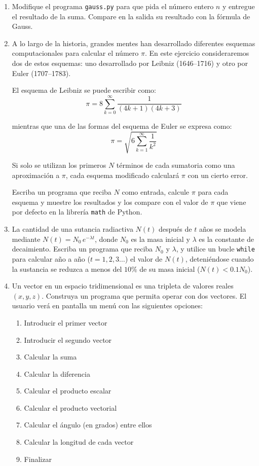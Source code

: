 \documentclass[12pt]{article}
\begin{document}
\begin{problemas}[]
\begin{enumerate}[leftmargin=*]

\item Modifique el programa \lstinline|gauss.py| para que pida el número entero $n$ y 
entregue el resultado de la suma. Compare en la salida su resultado con la fórmula de Gauss.

\item A lo largo de la historia, grandes mentes han desarrollado diferentes esquemas computacionales para calcular el número $\pi$. En este ejercicio consideraremos dos de estos esquemas: uno desarrollado por Leibniz (1646–1716) y otro por Euler (1707–1783).

El esquema de Leibniz se puede escribir como:
\[
\pi = 8 \sum_{k=0}^{\infty} \frac{1}{(4k + 1)(4k + 3)}
\]

mientras que una de las formas del esquema de Euler se expresa como:
\[
\pi = \sqrt{6 \sum_{k=1}^{\infty} \frac{1}{k^2}}
\]

Si solo se utilizan los primeros $N$ términos de cada sumatoria como una aproximación a 
$\pi$, cada esquema modificado calculará $\pi$ con un cierto error.

Escriba un programa que reciba $N$ como entrada, calcule $\pi$ para cada esquema y 
muestre los resultados y los compare con el valor de $\pi$ que viene por defecto en la
librería \lstinline|math| de Python.

\item  La cantidad de una sutancia radiactiva $N(t)$ después de $t$ años se modela mediante 
$N(t) = N_0 \, e^{-\lambda t}$, donde $N_0$ es la masa inicial y $\lambda$ es la constante 
de decaimiento. Escriba un programa que reciba $N_0$ y $\lambda$, 
y utilice un bucle \lstinline|while| para calcular año a año ($t = 1, 2, 3 \dots$) 
el valor de $N(t)$, deteniéndose cuando la sustancia se reduzca a menos del $10\%$ de su 
masa inicial ($N(t) < 0.1 N_0$).

\item Un vector en un espacio tridimensional es una tripleta de valores reales $(x, y, z)$. 
Construya un programa que permita operar con dos vectores. 
El usuario verá en pantalla un menú con las siguientes opciones:

\begin{enumerate}[label=\arabic*)]
    \item Introducir el primer vector
    \item Introducir el segundo vector
    \item Calcular la suma
    \item Calcular la diferencia
    \item Calcular el producto escalar
    \item Calcular el producto vectorial
    \item Calcular el ángulo (en grados) entre ellos
    \item Calcular la longitud de cada vector
    \item Finalizar
\end{enumerate}
\end{enumerate}

\end{problemas}
\end{document}
